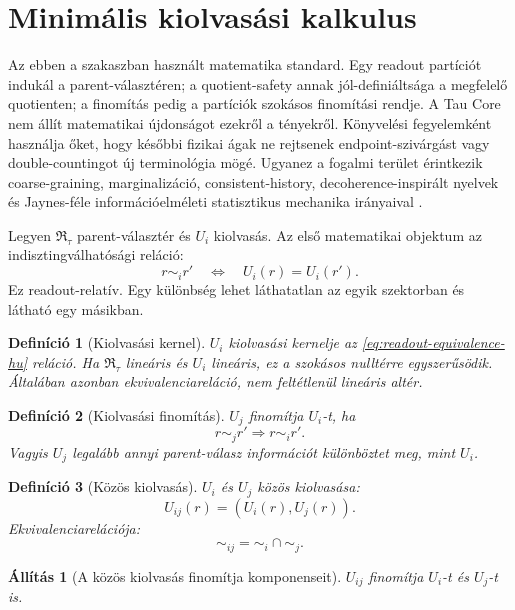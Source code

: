 \documentclass[12pt]{article}
\newtheorem{definition}{Definíció}
\newtheorem{proposition}{Állítás}
\newcommand{\RTspace}{\mathfrak R_{\tau}}
\begin{document}
\section{Minimális kiolvasási kalkulus}

Az ebben a szakaszban használt matematika standard.  Egy readout partíciót
indukál a parent-választéren; a quotient-safety annak jól-definiáltsága a
megfelelő quotienten; a finomítás pedig a partíciók szokásos finomítási
rendje.  A Tau Core nem állít matematikai újdonságot ezekről a tényekről.
Könyvelési fegyelemként használja őket, hogy későbbi fizikai ágak ne rejtsenek
endpoint-szivárgást vagy double-countingot új terminológia mögé.  Ugyanez a
fogalmi terület érintkezik coarse-graining, marginalizáció, consistent-history,
decoherence-inspirált nyelvek és Jaynes-féle információelméleti statisztikus
mechanika irányaival \cite{Griffiths1984,GellMannHartle1990,Jaynes1957a,Jaynes1957b}.

Legyen \(\RTspace\) parent-választér és \(U_i\) kiolvasás.  Az első
matematikai objektum az indisztingválhatósági reláció:
\begin{equation}
  r\sim_i r' \quad\Longleftrightarrow\quad U_i(r)=U_i(r').
  \label{eq:readout-equivalence-hu}
\end{equation}
Ez readout-relatív.  Egy különbség lehet láthatatlan az egyik szektorban és
látható egy másikban.

\begin{definition}[Kiolvasási kernel]
\(U_i\) kiolvasási kernelje az \eqref{eq:readout-equivalence-hu} reláció.  Ha
\(\RTspace\) lineáris és \(U_i\) lineáris, ez a szokásos nulltérre
egyszerűsödik.  Általában azonban ekvivalenciareláció, nem feltétlenül
lineáris altér.
\end{definition}

\begin{definition}[Kiolvasási finomítás]
\(U_j\) finomítja \(U_i\)-t, ha
\[
  r\sim_j r'\Longrightarrow r\sim_i r'.
\]
Vagyis \(U_j\) legalább annyi parent-válasz információt különböztet meg, mint
\(U_i\).
\end{definition}

\begin{definition}[Közös kiolvasás]
\(U_i\) és \(U_j\) közös kiolvasása:
\[
  U_{ij}(r)=(U_i(r),U_j(r)).
\]
Ekvivalenciarelációja:
\[
  \sim_{ij}=\sim_i\cap\sim_j.
\]
\end{definition}

\begin{proposition}[A közös kiolvasás finomítja komponenseit]
\(U_{ij}\) finomítja \(U_i\)-t és \(U_j\)-t is.
\end{proposition}
\end{document}
